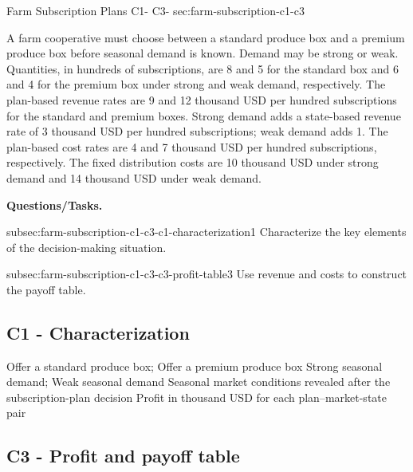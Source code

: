 	\sectionScored
	{Farm Subscription Plans}
	{C1- \hspace{2mm} C3-}
	{sec:farm-subscription-c1-c3}
	{
		A farm cooperative must choose between a standard produce box and a
		premium produce box before seasonal demand is known. Demand may be
		strong or weak. Quantities, in hundreds of subscriptions, are 8 and 5
		for the standard box and 6 and 4 for the premium box under strong and
		weak demand, respectively. The plan-based revenue rates are 9 and 12
		thousand USD per hundred subscriptions for the standard and premium
		boxes. Strong demand adds a state-based revenue rate of 3 thousand USD
		per hundred subscriptions; weak demand adds 1. The plan-based cost rates
		are 4 and 7 thousand USD per hundred subscriptions, respectively. The
		fixed distribution costs are 10 thousand USD under strong demand and
		14 thousand USD under weak demand.
		
		\textbf{Questions/Tasks.}
		\begin{enumerate}
			\CriterionTask
			{subsec:farm-subscription-c1-c3-c1-characterization}{1}
			{Characterize the key elements of the decision-making situation. }
			
			\CriterionTask
			{subsec:farm-subscription-c1-c3-c3-profit-table}{3}
			{Use revenue and costs to construct the payoff table. }
		\end{enumerate}
		
		\label{subsec:farm-subscription-c1-c3-c1-characterization}
		\subsection*{C1 - Characterization }
		
		\DecisionElementsTable
		{Offer a standard produce box; Offer a premium produce box}
		{Strong seasonal demand; Weak seasonal demand}
		{Seasonal market conditions revealed after the subscription-plan decision}
		{Profit in thousand USD for each plan--market-state pair}
		
		\label{subsec:farm-subscription-c1-c3-c3-profit-table}
		\subsection*{C3 - Profit and payoff table }
		
		
}
